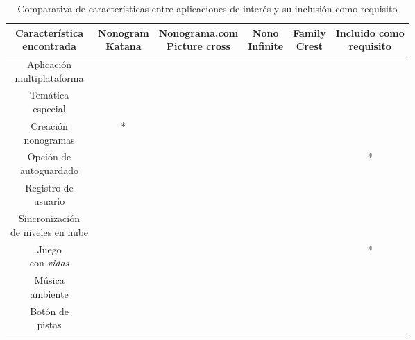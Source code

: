 \renewcommand\theadalign{b}
\renewcommand\theadfont{\bfseries}
\renewcommand\theadgape{\Gape[1pt]}
\renewcommand\cellgape{\Gape[1pt]}
\newcommand{\cmark}{{\ding{51}}}
\newcommand{\xmark}{{\ding{55}}}
\begin{table}[H]
  \caption{Comparativa de características entre aplicaciones de interés y su inclusión como requisito}
    \begin{tabular}{ | c | c | c | c | c | c |}
      \hline
      \thead{Característica \\ encontrada} & \thead{Nonogram \\ Katana} & \thead{Nonograma.com \\ Picture cross} & \thead{Nono \\ Infinite} & \thead{Family \\ Crest} & \thead{Incluido como \\ requisito} \\
      \hline
      \makecell{Aplicación \\ multiplataforma} &  \cmark  & \cmark  & \xmark & \cmark & \cmark \\
      \hline
      \makecell{Temática \\ especial} &  \cmark  & \xmark  & \cmark & \cmark & \cmark \\
      \hline
      \makecell{Creación \\ nonogramas} &  \cmark*  & \xmark  & \xmark & \xmark & \cmark \\
      \hline
      \makecell{Opción de \\ autoguardado} &  \cmark  & \cmark  & \xmark & \xmark & \cmark* \\
      \hline
      \makecell{Registro de \\ usuario} &  \cmark  & \xmark  & \xmark & \xmark & \xmark \\
      \hline
      \makecell{Sincronización \\de niveles en nube} &  \cmark  & \xmark  & \xmark & \xmark & \cmark \\
      \hline
      \makecell{Juego \\ con \textit{vidas}} &  \xmark  & \cmark  & \xmark & \xmark & \cmark* \\
      \hline
      \makecell{Música \\ ambiente} &  \xmark  & \xmark  & \xmark & \cmark & \xmark \\
      \hline
      \makecell{Botón de \\ pistas} &  \xmark  & \cmark  & \xmark & \xmark & \xmark \\

\end{tabular}
\end{table}
